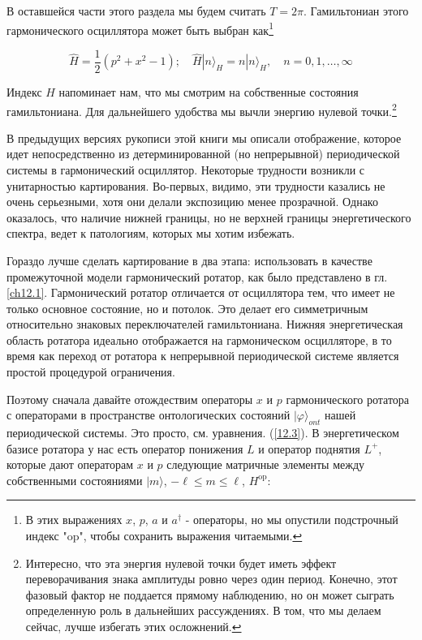 \documentclass[main.tex]{subfiles}
\begin{document}
В оставшейся части этого раздела мы будем считать $T = 2\pi$. Гамильтониан этого гармонического осциллятора может быть выбран как\footnote{В этих выражениях $x$, $p$, $a$ и $a^\dagger$ - операторы, но мы опустили подстрочный индекс "op", чтобы сохранить выражения читаемыми.}

\begin{equation}\label{13.3}
	\hat H=\frac{1}{2}\left(p^{2}+x^{2}-1\right) ; \quad \hat H|n\rangle_{H}=n|n\rangle_{H}, \quad n=0,1, \ldots, \infty
\end{equation}

Индекс $H$ напоминает нам, что мы смотрим на собственные состояния гамильтониана. Для дальнейшего удобства мы вычли энергию нулевой точки.\footnote{Интересно, что эта энергия нулевой точки будет иметь эффект переворачивания знака амплитуды ровно через один период. Конечно, этот фазовый фактор не поддается прямому наблюдению, но он может сыграть определенную роль в дальнейших рассуждениях. В том, что мы делаем сейчас, лучше избегать этих осложнений.}

В предыдущих версиях рукописи этой книги мы описали отображение, которое идет непосредственно из детерминированной (но непрерывной) периодической системы в гармонический осциллятор. Некоторые трудности возникли с унитарностью картирования. Во-первых, видимо, эти трудности казались не очень серьезными, хотя они делали экспозицию менее прозрачной. Однако оказалось, что наличие нижней границы, но не верхней границы энергетического спектра, ведет к патологиям, которых мы хотим избежать.

Гораздо лучше сделать картирование в два этапа: использовать в качестве промежуточной модели гармонический ротатор, как было представлено в гл. \ref{ch12.1}. Гармонический ротатор отличается от осциллятора тем, что имеет не только основное состояние, но и потолок. Это делает его симметричным относительно знаковых переключателей гамильтониана. Нижняя энергетическая область ротатора идеально отображается на гармоническом осцилляторе, в то время как переход от ротатора к непрерывной периодической системе является простой процедурой ограничения.

Поэтому сначала давайте отождествим операторы $x$ и $p$ гармонического ротатора с операторами в пространстве онтологических состояний $\mid\varphi\rangle_{ont} $ нашей периодической системы. Это просто, см. уравнения. (\ref{12.3}). В энергетическом базисе ротатора у нас есть оператор понижения $L$ и оператор поднятия $L^+$, которые дают операторам $x$ и $p$ следующие матричные элементы между собственными состояниями $\mid m \rangle$, $-\ell \le m \le \ell$, $H^{\mathrm{op}}$:
\end{document}

